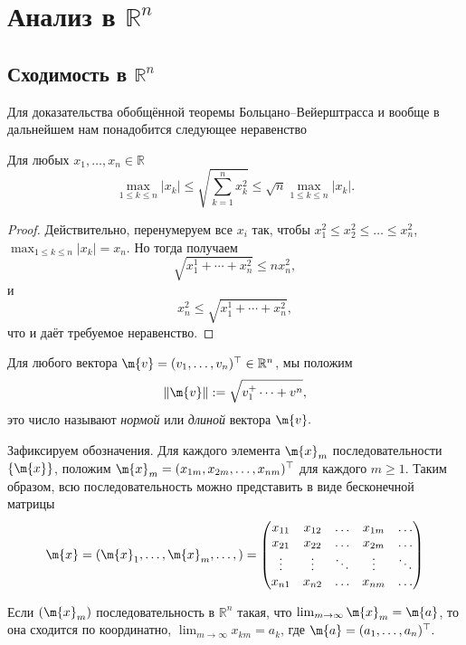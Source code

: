 \chapter{Анализ в $\mathbb{R}^n$}

\section{Сходимость в $\mathbb{R}^n$}



Для доказательства обобщённой теоремы Больцано--Вейерштрасса и вообще в дальнейшем нам понадобится следующее неравенство

\begin{lemma}\label{m<d<M}
Для любых $x_1,\ldots, x_n \in \mathbb{R}$ 
\[
\max_{1 \le k \le n} |x_k| \le \sqrt{\sum_{k=1}^n x_k^2} \le \sqrt{n} \max_{1\le k \le n} |x_k|.
\]
\end{lemma}
\begin{proof}
 
Действительно, перенумеруем все $x_i$ так, чтобы $x_1^2 \le x_2^2 \le \ldots \le x_n^2$, \ie $\max_{1 \le k \le n} |x_k| = x_n$. Но тогда получаем
\[
 \sqrt{x_1^1 + \cdots + x_n^2} \le n x_n^2, 
\]
и 
\[
 x_n^2 \le \sqrt{x_1^1 + \cdots + x_n^2},
\]
что и даёт требуемое неравенство.    
\end{proof}

Для любого вектора $\m{v} = (v_1,\ldots, v_n)^\top \in \mathbb{R}^n$, мы положим 
\[
 \| \m{v} \| : = \sqrt{ v_1^ + \cdots + v^n},
\]
это число называют \textit{нормой} или \textit{длиной} вектора $\m{v}.$




Зафиксируем обозначения. Для каждого элемента $\m{x}_m$ последовательности $\{\m{x}\}$, положим $\m{x}_m = (x_{1m}, x_{2m}, \ldots, x_{nm})^\top$ для каждого $m \ge 1$. Таким образом, всю последовательность можно представить в виде бесконечной матрицы
   \[
    \m{x} = (\m{x}_1,\ldots, \m{x}_m, \ldots,) = \begin{pmatrix}
        x_{11} & x_{12} & \ldots & x_{1m} & \ldots \\
        x_{21} & x_{22} & \ldots & x_{2m} & \ldots \\
        \vdots & \vdots & \ddots & \vdots & \ddots \\
        x_{n1} & x_{n2} & \ldots & x_{nm} & \ldots
    \end{pmatrix}
   \]

\begin{lemma}
    Если $(\m{x}_m)$ последовательность в $\mathbb{R}^n$ такая, что $\lim_{m \to \infty}\m{x}_m = \m{a}$, то она сходится по координатно, \ie $\lim_{m\to \infty}x_{km} = a_k$, где $\m{a} = (a_1, \ldots, a_n)^\top.$
\end{lemma}


